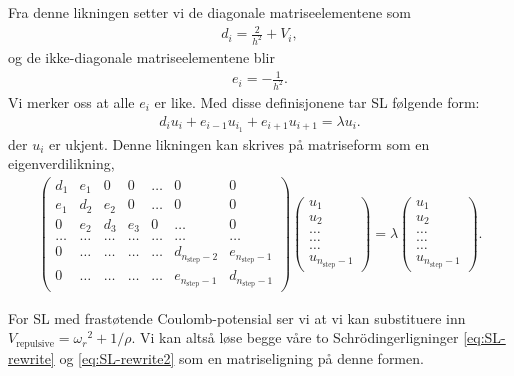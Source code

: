 \documentclass[11pt]{article}
\begin{document}
Fra denne likningen setter vi de diagonale matriseelementene som 
\begin{align*}
  d_i = \frac{ 2 }{ h^2 } + V_i,
\end{align*}
og de ikke-diagonale matriseelementene blir 
\begin{align*}
  e_i = -\frac{ 1 }{ h^2 }.
\end{align*}
Vi merker oss at alle $e_i$ er like. Med disse definisjonene tar SL
følgende form:
\begin{align*}
  d_iu_i + e_{i-1}u_{i_1} + e_{i+1}u_{i+1} = \lambda u_i.
\end{align*}
der $u_i$ er ukjent. Denne likningen kan skrives på matriseform som
en eigenverdilikning,
\begin{align}
  \left(\begin{array}{ccccccc}
      d_1 & e_1 & 0 & 0 & \dots & 0 & 0\\
      e_1& d_2 & e_2 & 0 & \dots & 0 & 0\\
      0  & e_2 & d_3 & e_3 & 0 & \dots & 0\\
      \dots & \dots & \dots & \dots & \dots & \dots & \dots\\
      0 & \dots & \dots & \dots & \dots & d_{n_\text{step}-2} & e_{n_\text{step}-1}\\
      0 & \dots & \dots & \dots & \dots & e_{n_\text{step}-1} & d_{n_\text{step}-1}
    \end{array}\right)
    \left(\begin{array}{c}
        u_1\\
        u_2\\
        \dots\\
        \dots\\
        \dots\\
        u_{n_\text{step}-1}
      \end{array}\right) = 
     \lambda 
    \left(\begin{array}{c}
        u_1\\
        u_2\\
        \dots\\
        \dots\\
        \dots\\
        u_{n_\text{step}-1}
      \end{array}\right)\label{eq:SL-matrix}.
\end{align}

For SL med frastøtende Coulomb-potensial ser vi at vi kan substituere
inn $V_\text{repulsive} = {\omega_r}^2 + 1/\rho$. 
Vi kan altså løse begge våre to Schr\"odingerligninger \eqref{eq:SL-rewrite} 
og \eqref{eq:SL-rewrite2} som en matriseligning på denne formen. 
\end{document}
